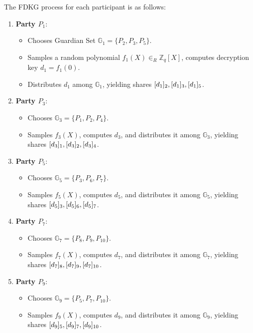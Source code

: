 \documentclass[runningheads]{llncs}
\begin{document}
The FDKG process for each participant is as follows:

\begin{enumerate}
    \item \textbf{Party $P_1$}:
        \begin{itemize}
            \item Chooses Guardian Set $\mathbb{G}_1 = \{P_2, P_3, P_5\}$.
            \item Samples a random polynomial $f_1(X) \in_R \mathbb{Z}_q[X]$, computes decryption key $d_1 = f_1(0)$.
            \item Distributes $d_1$ among $\mathbb{G}_1$, yielding shares $[d_{1}]_{2}, [d_{1}]_{3}, [d_{1}]_{5}$.
        \end{itemize}

    \item \textbf{Party $P_3$}:
        \begin{itemize}
            \item Chooses $\mathbb{G}_3 = \{P_1, P_2, P_4\}$.
            \item Samples $f_3(X)$, computes $d_3$, and distributes it among $\mathbb{G}_3$, yielding shares $[d_{3}]_{1}, [d_{3}]_{2}, [d_{3}]_{4}$.
        \end{itemize}

    \item \textbf{Party $P_5$}:
        \begin{itemize}
            \item Chooses $\mathbb{G}_5 = \{P_3, P_6, P_7\}$.
            \item Samples $f_5(X)$, computes $d_5$, and distributes it among $\mathbb{G}_5$, yielding shares $[d_{5}]_{3}, [d_{5}]_{6}, [d_{5}]_{7}$.
        \end{itemize}

    \item \textbf{Party $P_7$}:
        \begin{itemize}
            \item Chooses $\mathbb{G}_7 = \{P_8, P_9, P_{10}\}$.
            \item Samples $f_7(X)$, computes $d_7$, and distributes it among $\mathbb{G}_7$, yielding shares $[d_{7}]_{8}, [d_{7}]_{9}, [d_{7}]_{10}$.
        \end{itemize}

    \item \textbf{Party $P_9$}:
        \begin{itemize}
            \item Chooses $\mathbb{G}_9 = \{P_5, P_7, P_{10}\}$.
            \item Samples $f_9(X)$, computes $d_9$, and distributes it among $\mathbb{G}_9$, yielding shares $[d_{9}]_{5}, [d_{9}]_{7}, [d_{9}]_{10}$.
        \end{itemize}
\end{enumerate}
\end{document}
